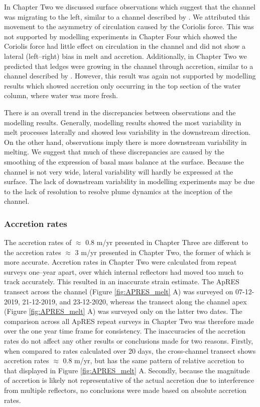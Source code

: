 In Chapter Two we discussed surface observations which suggest that the channel was migrating to the left, similar to a channel described by \cite{chartrand2020basal}. We attributed this movement to the asymmetry of circulation caused by the Coriolis force. This was not supported by modelling experiments in Chapter Four which showed the Coriolis force had little effect on circulation in the channel and did not show a lateral (left--right) bias in melt and accretion. Additionally, in Chapter Two we predicted that ledges were growing in the channel through accretion, similar to a channel described by \cite{dutrieux2014basal}. However, this result was again not supported by modelling results which showed accretion only occurring in the top section of the water column, where water was more fresh.

There is an overall trend in the discrepancies between observations and the modelling results. Generally, modelling results showed the most variability in melt processes laterally and showed less variability in the downstream direction. On the other hand, observations imply there is more downstream variability in melting.
We suggest that much of these discrepancies are caused by the smoothing of the expression of basal mass balance at the surface. Because the channel is not very wide, lateral variability will hardly be expressed at the surface. The lack of downstream variability in modelling experiments may be due to the lack of resolution to resolve plume dynamics at the inception of the channel.

\subsubsection{Accretion rates}

The accretion rates of $\approx$ 0.8 m/yr presented in Chapter Three are different to the accretion rates $\approx$ 3 m/yr presented in Chapter Two, the former of which is more accurate. Accretion rates in Chapter Two were calculated from repeat surveys one--year apart, over which internal reflectors had moved too much to track accurately. This resulted in an inaccurate strain estimate. The ApRES transect across the channel (Figure \ref{fig:APRES_melt} A) was surveyed on 07-12-2019, 21-12-2019, and 23-12-2020, whereas the transect along the channel apex (Figure \ref{fig:APRES_melt} A) was surveyed only on the latter two dates. The comparison across all ApRES repeat surveys in Chapter Two was therefore made over the one year time frame for consistency.  The inaccuracies of the accretion rates do not affect any other results or conclusions made for two reasons. Firstly, when compared to rates calculated over 20 days, the cross-channel transect shows accretion rates $\approx$ 0.8 m/yr, but has the same pattern of relative accretion to that displayed in Figure \ref{fig:APRES_melt} A.  Secondly, because the magnitude of accretion is likely not representative of the actual accretion due to interference from multiple reflectors, no conclusions were made based on absolute accretion rates.

